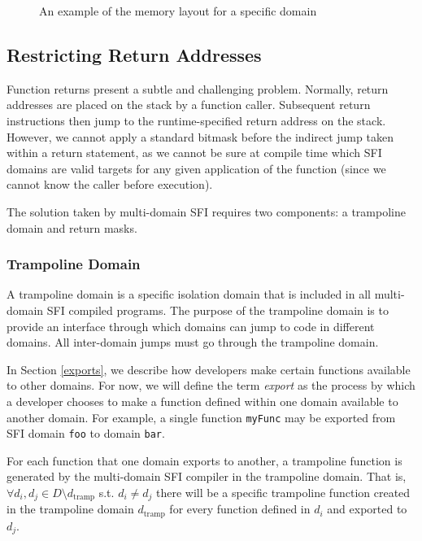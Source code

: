 \documentclass[12pt]{article}
\begin{document}
\begin{figure}
\centering
\begin{drawstack}
	\startframe
		 
		 
\end{drawstack}
\caption{An example of the memory layout for a specific domain} \label{domain_layout}
\end{figure}

\subsection{Restricting Return Addresses}

Function returns present a subtle and challenging problem. Normally, return addresses are placed on the stack by a function caller. Subsequent return instructions then jump to the runtime-specified return address on the stack. However, we cannot apply a standard bitmask before the indirect jump taken within a return statement, as we cannot be sure at compile time which SFI domains are valid targets for any given application of the function (since we cannot know the caller before execution).

The solution taken by multi-domain SFI requires two components: a trampoline domain and return masks. 

\subsubsection{Trampoline Domain} \label{trampoline}

A trampoline domain is a specific isolation domain that is included in all multi-domain SFI compiled programs. The purpose of the trampoline domain is to provide an interface through which domains can jump to code in different domains. All inter-domain jumps must go through the trampoline domain.

In Section \ref{exports}, we describe how developers make certain functions available to other domains. For now, we will define the term \textit{export} as the process by which a developer chooses to make a function defined within one domain available to another domain. For example, a single function \texttt{myFunc} may be exported from SFI domain \texttt{foo} to domain \texttt{bar}.

For each function that one domain exports to another, a trampoline function is generated by the multi-domain SFI compiler in the trampoline domain. That is, $\forall d_i, d_j \in D\setminus d_\text{tramp}$ s.t. $d_i\neq d_j$ there will be a specific trampoline function created in the trampoline domain $d_\text{tramp}$ for every function defined in $d_i$ and exported to $d_j$.
\end{document}
